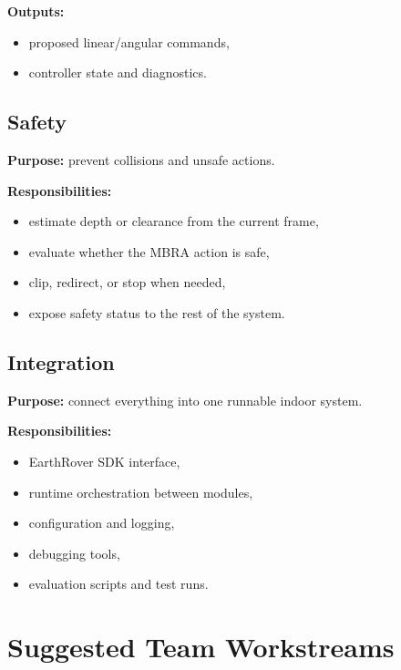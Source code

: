 \documentclass[11pt,a4paper]{article}
\begin{document}
\textbf{Outputs:}
\begin{itemize}[nosep]
  \item proposed linear/angular commands,
  \item controller state and diagnostics.
\end{itemize}


\subsection{Safety}

\textbf{Purpose:} prevent collisions and unsafe actions.

\textbf{Responsibilities:}
\begin{itemize}[nosep]
  \item estimate depth or clearance from the current frame,
  \item evaluate whether the MBRA action is safe,
  \item clip, redirect, or stop when needed,
  \item expose safety status to the rest of the system.
\end{itemize}


\subsection{Integration}

\textbf{Purpose:} connect everything into one runnable indoor system.

\textbf{Responsibilities:}
\begin{itemize}[nosep]
  \item EarthRover SDK interface,
  \item runtime orchestration between modules,
  \item configuration and logging,
  \item debugging tools,
  \item evaluation scripts and test runs.
\end{itemize}


\section{Suggested Team Workstreams}
\end{document}
